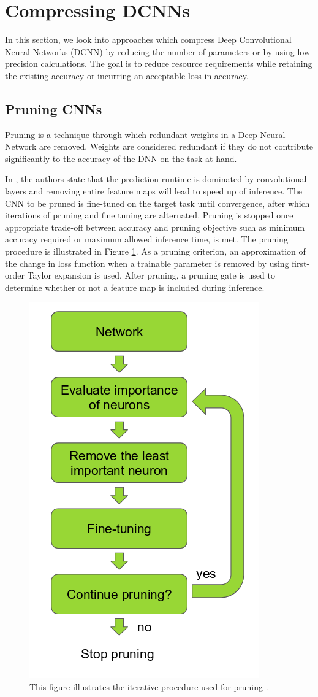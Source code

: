 \section{Compressing DCNNs}
\label{section:compress}

In this section, we look into approaches which compress Deep Convolutional Neural Networks (DCNN) by reducing the number of parameters or by using low precision calculations. The goal is to reduce resource requirements while retaining the existing accuracy or incurring an acceptable loss in accuracy. 

\subsection{Pruning CNNs}

Pruning is a technique through which redundant weights in a Deep Neural Network are removed. Weights are considered redundant if they do not contribute significantly to the accuracy of the DNN on the task at hand. 

In \cite{DBLP:journals/corr/MolchanovTKAK16}, the authors state that the prediction runtime is dominated by convolutional layers and removing entire feature maps will lead to speed up of inference. The CNN to be pruned is fine-tuned on the target task until convergence, after which iterations of pruning and fine tuning are alternated. Pruning is stopped once appropriate trade-off between accuracy and pruning objective such as minimum accuracy required or maximum allowed inference time, is met. The pruning procedure is illustrated in Figure \ref{Fig:prune}. As a pruning criterion, an approximation of the change in loss function when a trainable parameter is removed by using first-order Taylor expansion is used. After pruning, a pruning gate is used to determine whether or not a feature map is included during inference.

	\begin{figure}[h]
		\centering
		\includegraphics[width=.3\linewidth]{images/pruning_rei}
		\caption{This figure illustrates the iterative procedure used for pruning \cite{DBLP:journals/corr/MolchanovTKAK16}.}
		\label{Fig:prune}
	\end{figure}

